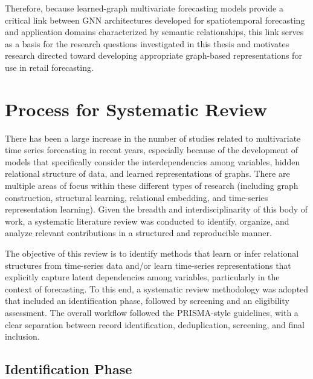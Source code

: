 Therefore, because learned-graph multivariate forecasting models provide a critical link between GNN architectures developed for spatiotemporal forecasting and application domains characterized by semantic relationships, this link serves as a basis for the research questions investigated in this thesis and motivates research directed toward developing appropriate graph-based representations for use in retail forecasting.



\section{Process for Systematic Review}

There has been a large increase in the number of studies related to multivariate time series forecasting in recent years, especially because of the development of models that specifically consider the interdependencies among variables, hidden relational structure of data, and learned representations of graphs. There are multiple areas of focus within these different types of research (including graph construction, structural learning, relational embedding, and time-series representation learning). Given the breadth and interdisciplinarity of this body of work, a systematic literature review was conducted to identify, organize, and analyze relevant contributions in a structured and reproducible manner.

The objective of this review is to identify methods that learn or infer relational structures from time-series data and/or  learn time-series representations that explicitly capture latent dependencies among variables, particularly in the context of forecasting. To this end, a systematic review methodology was adopted that included an identification phase, followed by screening and an eligibility assessment. The overall workflow followed the PRISMA-style guidelines, with a clear separation between record identification, deduplication, screening, and final inclusion.

\subsection{Identification Phase}

